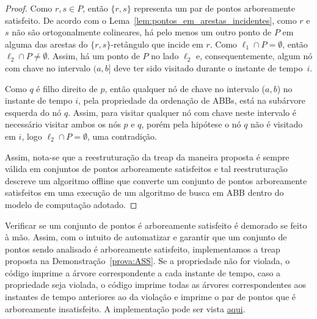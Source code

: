 \begin{proof}
Como $r,s \in P$, então $\{r,s\}$ representa um par de pontos arboreamente satisfeito. De acordo com o Lema~\ref{lem:pontos_em_arestas_incidentes}, como $r$ e $s$ não são ortogonalmente colineares, há pelo menos um outro ponto de $P$ em alguma das arestas do $\{r,s\}$-retângulo que incide em $r$. Como $\ell_1 \cap P = \emptyset$, então $\ell_2 \cap P \neq \emptyset$. Assim, há um ponto de $P$ no lado $\ell_2$ e, consequentemente, algum nó com chave no intervalo $(a,b]$ deve ter sido visitado durante o instante de tempo~$i$.

Como $q$ é filho direito de $p$, então qualquer nó de chave no intervalo ($a,b$) no instante de tempo $i$, pela propriedade da ordenação de ABBs, está na subárvore esquerda do nó $q$. Assim, para visitar qualquer nó com chave neste intervalo é necessário visitar ambos os nós $p$ e $q$, porém pela hipótese o nó $q$ não é visitado em $i$, logo $\ell_2 \cap P = \emptyset$, uma contradição.

Assim, nota-se que a reestruturação da treap da maneira proposta é sempre válida em conjuntos de pontos arboreamente satisfeitos e tal reestruturação descreve um algoritmo offline que converte um conjunto de pontos arboreamente satisfeitos em uma execução de um algoritmo de busca em ABB dentro do modelo de computação adotado.
\end{proof}

Verificar se um conjunto de pontos é arboreamente satisfeito é demorado se feito à mão. Assim, com o intuito de automatizar e garantir que um conjunto de pontos sendo analisado é arboreamente satisfeito, implementamos a treap proposta na Demonstração~\ref{prova:ASS}. %
Se a propriedade não for violada, o código imprime a árvore correspondente a cada instante de tempo, caso a propriedade seja violada, o código imprime todas as árvores correspondentes aos instantes de tempo anteriores ao da violação e imprime o par de pontos que é arboreamente insatisfeito. A implementação pode ser vista \href{https://github.com/BrunoArmondBraga/TCC/blob/main/src/ValidAss.cpp}{aqui}.


